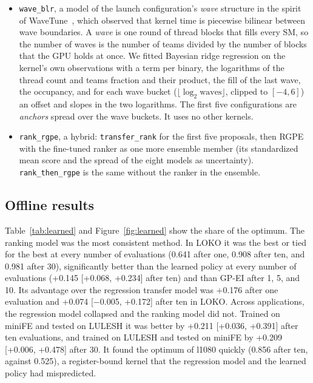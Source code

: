 \documentclass[10pt]{article}
\newcommand{\code}[1]{\texttt{#1}}
\begin{document}
\begin{itemize}
  features are those of the transfer cost model.
\item \code{wave\_blr}, a model of the launch configuration's \emph{wave}
  structure in the spirit of WaveTune~\cite{zhang2026wavetune}, which
  observed that kernel time is piecewise bilinear between wave boundaries. A
  \emph{wave} is one round of thread blocks that fills every SM, so the
  number of waves is the number of teams divided by the number of blocks that
  the GPU holds at once. We fitted Bayesian ridge regression on the kernel's
  own observations with a term per binary, the logarithms of the thread count
  and teams fraction and their product, the fill of the last wave, the
  occupancy, and for each wave bucket ($\lfloor \log_2 \text{waves}
  \rfloor$, clipped to $[-4, 6]$) an offset and slopes in the two
  logarithms. The first five configurations are \emph{anchors} spread over
  the wave buckets. It uses no other kernels.
\item \code{rank\_rgpe}, a hybrid: \code{transfer\_rank} for the first five
  proposals, then RGPE with the fine-tuned ranker as one more ensemble
  member (its standardized mean score and the spread of the eight models as
  uncertainty). \code{rank\_then\_rgpe} is the same without the ranker in the
  ensemble.
\end{itemize}

\subsection{Offline results}
Table~\ref{tab:learned} and Figure~\ref{fig:learned} show the share of the
optimum. The ranking model was the most consistent method. In LOKO it was the
best or tied for the best at every number of evaluations (0.641 after one,
0.908 after ten, and 0.981 after 30), significantly better than the learned
policy at every number of evaluations (+0.145 [+0.068, +0.234] after ten) and
than GP-EI after 1, 5, and 10. Its advantage over the regression transfer
model was +0.176 after one evaluation and +0.074 [$-$0.005, +0.172] after ten
in LOKO. Across applications, the regression model collapsed and the ranking
model did not. Trained on miniFE and tested on LULESH it was better by +0.211
[+0.036, +0.391] after ten evaluations, and trained on LULESH and tested on
miniFE by +0.209 [+0.006, +0.478] after 30. It found the optimum of l1080
quickly (0.856 after ten, against 0.525), a register-bound kernel that the
regression model and the learned policy had mispredicted.
\end{document}
